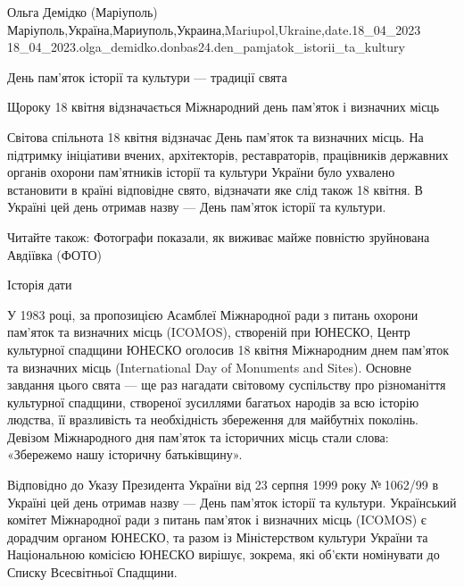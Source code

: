  
 
 
 
 

Ольга Демідко (Маріуполь)
Маріуполь,Україна,Мариуполь,Украина,Mariupol,Ukraine,date.18_04_2023
18_04_2023.olga_demidko.donbas24.den_pamjatok_istorii_ta_kultury

День пам'яток історії та культури — традиції свята

Щороку 18 квітня відзначається Міжнародний день пам'яток і визначних місць

Світова спільнота 18 квітня відзначає День пам'яток та визначних місць. На
підтримку ініціативи вчених, архітекторів, реставраторів, працівників державних
органів охорони пам'ятників історії та культури України було ухвалено
встановити в країні відповідне свято, відзначати яке слід також 18 квітня. В
Україні цей день отримав назву — День пам'яток історії та культури.

Читайте також: Фотографи показали, як виживає майже повністю зруйнована
Авдіївка (ФОТО)

Історія дати

У 1983 році, за пропозицією Асамблеї Міжнародної ради з питань охорони пам'яток
та визначних місць (ICOMOS), створеній при ЮНЕСКО, Центр культурної спадщини
ЮНЕСКО оголосив 18 квітня Міжнародним днем пам'яток та визначних місць
(International Day of Monuments and Sites). Основне завдання цього свята — ще
раз нагадати світовому суспільству про різноманіття культурної спадщини,
створеної зусиллями багатьох народів за всю історію людства, її вразливість та
необхідність збереження для майбутніх поколінь. Девізом Міжнародного дня
пам'яток та історичних місць стали слова: «Збережемо нашу історичну
батьківщину».

Відповідно до Указу Президента України від 23 серпня 1999 року № 1062/99 в
Україні цей день отримав назву — День пам'яток історії та культури. Український
комітет Міжнародної ради з питань пам'яток і визначних місць (ICOMOS) є
дорадчим органом ЮНЕСКО, та разом із Міністерством культури України та
Національною комісією ЮНЕСКО вирішує, зокрема, які об'єкти номінувати до Списку
Всесвітньої Спадщини.

